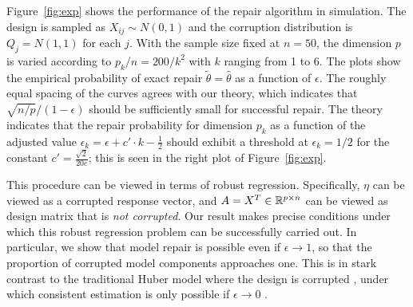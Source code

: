 Figure~\ref{fig:exp} shows the performance of
the repair algorithm in simulation. The design is sampled as $X_{ij} \sim N(0,1)$ and the corruption distribution is $Q_j = N(1,1)$ for each $j$. With the sample size fixed at $n=50$, the dimension $p$ is varied according to $p_k/n=200/k^2$ with
$k$ ranging from 1 to 6. The plots show the empirical probability of exact repair $\tilde\theta = \hat\theta$ as a function of $\epsilon$. The roughly equal spacing of the curves agrees with our theory, which indicates that $\sqrt{n/p}/(1-\epsilon)$ should be sufficiently small for successful repair. The theory indicates that the repair probability for dimension $p_k$ as a function of the adjusted value $\epsilon_k = \epsilon + c'\cdot k - \frac{1}{2}$ should exhibit a threshold at
$\epsilon_k = 1/2$ for the constant $c' = \frac{\sqrt{2}}{20 c}$; this is seen in the right plot of Figure~\ref{fig:exp}.



 This procedure can be viewed in terms of robust regression. Specifically, $\eta$ can be viewed as a corrupted response vector, and $A = X^T \in \mathbb{R}^{p\times n}$ can be viewed as design matrix that is \textit{not corrupted}.  Our result makes precise conditions under which this robust regression problem can be successfully carried out.
In particular, we show that model repair is possible even if $\epsilon \to 1$, so that the proportion of corrupted model components approaches one. This is in stark contrast to the traditional Huber model where the design is corrupted \citep{huber:64}, under which consistent estimation is only possible if $\epsilon \to 0$ \citep{chen2016,gao2020}.

